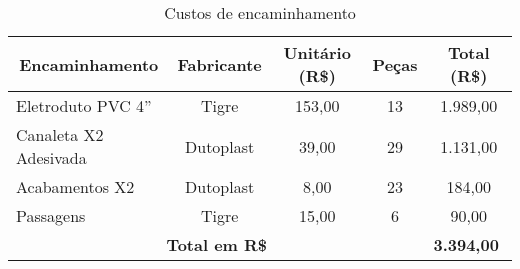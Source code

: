 \begin{table}[h!]
	\begin{center}
		\caption{Custos de encaminhamento}
		\label{tab11}
		\renewcommand{\arraystretch}{1.2}
\begin{tabular}{|l|c|c|c|c|}
	\hline
	\multicolumn{1}{|c|}{\textbf{Encaminhamento}} & \textbf{Fabricante} & \textbf{Unitário (R\$)} & \textbf{Peças} & \textbf{Total (R\$)}                       \\ \hline
	Eletroduto PVC 4”                             & Tigre               &  153,00              & 13             &  1.989,00                               \\ \hline
	Canaleta X2 Adesivada                         & Dutoplast           &  39,00               & 29             &  1.131,00                               \\ \hline
	Acabamentos X2                                & Dutoplast           &  8,00                & 23             & 184,00                                 \\ \hline
	Passagens                                     & Tigre               & 15,00               & 6              &  90,00                                  \\ \hline
	\multicolumn{4}{|c|}{\textbf{Total em R\$}}                                                                           & \multicolumn{1}{l|}{\textbf{ 3.394,00}} \\ \hline
	
\end{tabular}
\end{center}
\end{table}